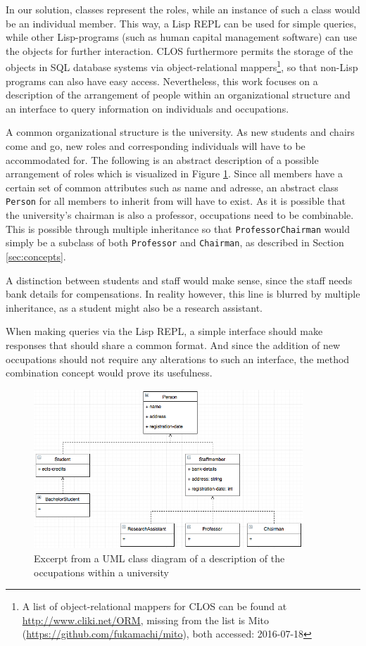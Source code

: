 \documentclass[oribibl]{llncs}
\begin{document}
In our solution, classes represent the roles, while an instance of such a class would be an individual member. This way, a Lisp REPL can be used for simple queries, while other Lisp-programs (such as human capital management software) can use the objects for further interaction. CLOS furthermore permits the storage of the objects in SQL database systems via object-relational mappers\footnote{A list of object-relational mappers for CLOS can be found at \url{http://www.cliki.net/ORM}, missing from the list is Mito (\url{https://github.com/fukamachi/mito}), both accessed: 2016-07-18}, so that non-Lisp programs can also have easy access. Nevertheless, this work focuses on a description of the arrangement of people within an organizational structure and  an interface to query information on individuals and occupations.
\newline

A common organizational structure is the university. As new students and chairs come and go, new roles and corresponding individuals will have to be accommodated for. The following is an abstract description of a possible arrangement of roles which is visualized in Figure \ref{fig:class-diagram}. Since all members have a certain set of common attributes such as name and adresse, an abstract class \texttt{Person} for all members to inherit from will have to exist. As it is possible that the university's chairman is also a professor, occupations need to be combinable. This is possible through multiple inheritance so that \texttt{ProfessorChairman} would simply be a subclass of both \texttt{Professor} and \texttt{Chairman}, as described in Section \ref{sec:concepts}. 

A distinction between students and staff would make sense, since the staff needs bank details for compensations. In reality however, this line is blurred by multiple inheritance, as a student might also be a research assistant.

When making queries via the Lisp REPL, a simple interface should make responses that should share a common format. And since the addition of new occupations should not require any alterations to such an interface, the method combination concept would prove its usefulness. 

\begin{figure}[]
    \centering
    \includegraphics[width=0.9\textwidth]{images/class-diagram.png}
    \caption{Excerpt from a UML class diagram of a description of the occupations within a university}
    \label{fig:class-diagram}
\end{figure}
\end{document}
